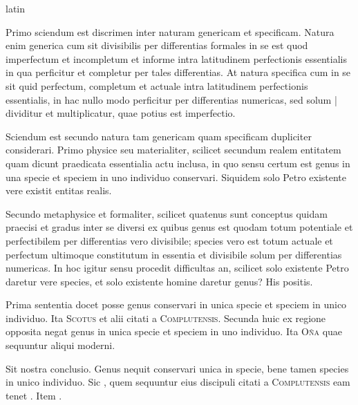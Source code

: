 \begin{otherlanguage*}{latin}
\pstart
{}
\pend

\pstart
Primo sciendum est discrimen inter naturam genericam et specificam. Natura enim generica cum sit divisibilis per differentias formales in se est quod imperfectum et incompletum et informe intra latitudinem perfectionis essentialis in qua perficitur et completur per tales differentias. At natura specifica cum in se sit quid perfectum, completum et actuale intra latitudinem perfectionis essentialis, in hac nullo modo perficitur per differentias numericas, sed solum \textnormal{|} dividitur et multiplicatur, quae potius est imperfectio. 
\pend

\pstart
Sciendum est secundo natura tam genericam quam specificam dupliciter considerari. Primo physice seu materialiter, scilicet secundum realem entitatem quam dicunt praedicata essentialia actu inclusa, in quo sensu certum est genus in una specie et speciem in uno individuo conservari. Siquidem solo Petro existente vere existit entitas realis. 
\pend

\pstart
Secundo metaphysice et formaliter, scilicet quatenus sunt conceptus quidam praecisi et gradus inter se diversi ex quibus genus est quodam totum potentiale et perfectibilem per differentias vero divisibile; species vero est totum actuale et perfectum ultimoque constitutum in essentia et divisibile solum per differentias numericas. In hoc igitur sensu procedit difficultas an, scilicet solo existente Petro daretur vere species, et solo existente homine daretur genus? His positis. 
\pend

\pstart
Prima sententia docet posse genus conservari in unica specie et speciem in unico individuo. Ita \textsc{Scotus} et alii citati a \textsc{Complutensis}\index[persons]{}. Secunda huic ex regione opposita negat genus in unica specie et speciem in uno individuo. Ita \textsc{Oña} quae sequuntur aliqui moderni. 
\pend

\pstart
Sit nostra conclusio. Genus nequit conservari unica in specie, bene tamen species in unico individuo. Sic , quem sequuntur eius discipuli citati a \textsc{Complutensis}\index[persons]{} eam tenet . Item . 
\pend


\end{otherlanguage*}
